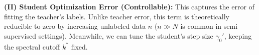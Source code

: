 \documentclass{article}
\theoremstyle{definition}
\theoremstyle{definition}
\theoremstyle{plain}
\theoremstyle{plain}
\theoremstyle{plain}
\theoremstyle{plain}
\theoremstyle{plain}
\newcommand{\bs}[1]{\boldsymbol{\mathbf{#1}}}
\newcommand{\te}{\mathrm{T}}
\newcommand{\st}{\mathrm{S}}
\newcommand{\M}{\mathbf{M}}
\newcommand{\inner}[1]{\left\langle#1\right\rangle}
\begin{document}




\textbf{(II) Student Optimization Error (Controllable):} This captures the error of fitting the teacher's labels. Unlike teacher error, this term is theoretically reducible to zero by increasing unlabeled data $n$ ($n \gg N$ is common in semi-supervised settings). Meanwhile, we can tune the student's step size $\gamma_0'$, keeping the spectral cutoff $k^*$ fixed.


\end{document}

